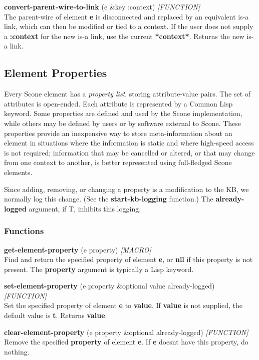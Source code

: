 \documentclass[titlepage,twoside,openright,11pt]{article}
\begin{document}
\textbf{convert-parent-wire-to-link} (e \&key :context)
\emph{{[}FUNCTION{]}\\
}The parent-wire of element \textbf{e} is disconnected and replaced by
an equivalent is-a link, which can then be modified or tied to a
context. If the user does not supply a \textbf{:context} for the new
is-a link, use the current \textbf{*context*}. Returns the new is-a
link.

\subsection{\texorpdfstring{ Element
Properties}{ Element Properties}}\label{element-properties}

Every Scone element has a \emph{property list}, storing attribute-value
pairs. The set of attributes is open-ended. Each attribute is
represented by a Common Lisp keyword. Some properties are defined and
used by the Scone implementation, while others may be defined by users
or by software external to Scone. These properties provide an
inexpensive way to store meta-information about an element in situations
where the information is static and where high-speed access is not
required; information that may be cancelled or altered, or that may
change from one context to another, is better represented using
full-fledged Scone elements.

Since adding, removing, or changing a property is a modification to the
KB, we normally log this change. (See the \textbf{start-kb-logging}
function.) The \textbf{already-logged} argument, if T, inhibits this
logging.

\subsubsection{Functions}\label{functions}

\textbf{get-element-property} (e property) \emph{{[}MACRO{]}}\\
Find and return the specified property of element \textbf{e}, or
\textbf{nil} if this property is not present. The \textbf{property}
argument is typically a Lisp keyword.

\textbf{set-element-property} (e property \&optional value
already-logged) \emph{{[}FUNCTION{]}}\\
Set the specified property of element \textbf{e} to \textbf{value}. If
\textbf{value} is not supplied, the default value is \textbf{t}. Returns
\textbf{value}.

\textbf{clear-element-property} (e property \&optional already-logged)
\emph{{[}FUNCTION{]}}\\
Remove the specified \textbf{property} of element \textbf{e}. If
\textbf{e} doesn\textquotesingle t have this property, do nothing.
\end{document}
